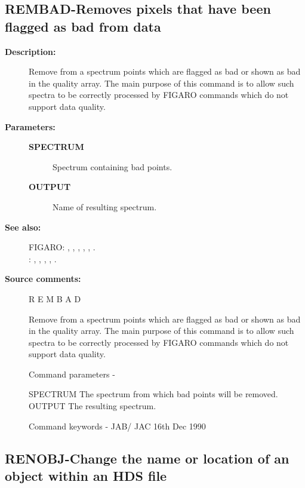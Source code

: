 \begin{description}
\subsection{REMBAD-\label{REMBAD}Removes pixels that have been flagged as bad from data}
\begin{description}

\item [\textbf{Description:}]
 Remove from a spectrum points which are flagged as bad or
 shown as bad in the quality array. The main purpose of this
 command is to allow such spectra to be correctly processed
 by FIGARO commands which do not support data quality.

\item [\textbf{Parameters:}]
\begin{description}
\item [\textbf{SPECTRUM}]
 Spectrum containing bad points.
\item [\textbf{OUTPUT}]
 Name of resulting spectrum.
\end{description}

\item [\textbf{See also:}]
FIGARO: , , , , , .\\
: , , , , .\\

\item [\textbf{Source comments:}]
\begin{terminalv}
 R E M B A D

 Remove from a spectrum points which are flagged as bad or
 shown as bad in the quality array. The main purpose of this
 command is to allow such spectra to be correctly processed by
 FIGARO commands which do not support data quality.

 Command parameters -

 SPECTRUM    The spectrum from which bad points will be removed.
 OUTPUT      The resulting spectrum.

 Command keywords -
                                     JAB/ JAC  16th Dec 1990
\end{terminalv}
\end{description}
\subsection{RENOBJ-\label{RENOBJ}Change the name or location of an object within an HDS file}
\begin{description}


\end{description}
\end{description}
